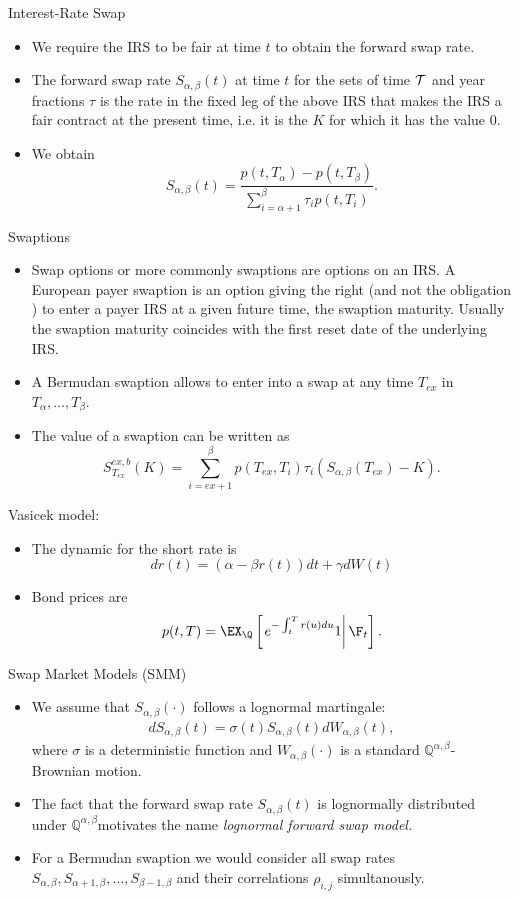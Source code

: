{Interest-Rate Swap}

\begin{itemize}
\item<1-> We require the IRS to be fair at time $t$ to obtain the
forward swap rate.
\item<2->
The forward swap rate $S_{\alpha,\beta}(t)$ at time $t$ for the
sets of time $\cal T$ and year fractions $\tau$ is the rate in the
fixed leg of the above IRS that makes the IRS a fair contract at
the present time, i.e. it is the $K$ for which
it has the value $0$.
\item<3->
 We obtain
\begin{equation}\label{FSR-1}
S_{\alpha,\beta}(t)=\frac{p(t,T_{\alpha})-p(t,T_{\beta})}{\sum_{i=\alpha+1}^{\beta}\tau_ip(t,T_i)}.
\end{equation}
\end{itemize}

{Swaptions}
\begin{itemize}
\item<1->Swap options or more commonly swaptions are options on an IRS. A
European payer swaption is an option giving the right (and not the
obligation ) to enter a payer IRS at a given future time, the
swaption maturity. Usually the swaption maturity coincides with
the first reset date of the underlying IRS.
\item<2->
A Bermudan swaption allows to enter into a swap at any time $T_{ex}$ in $T_\alpha, \ldots,
T_\beta$.
\item<3-> The value of  a swaption can be written as
$$
S_{T_{ex}}^{ex,b}(K)= \sum_{i=ex+1}^{\beta} p(T_{ex},T_i)\tau_i(S_{\alpha,\beta}(T_{ex})-K).
$$
\end{itemize}

{Vasicek model:}
\begin{itemize}
\item<1-> The dynamic for the short rate is
$$
dr(t) = (\alpha -\beta r(t))dt +\gamma dW(t)
$$
\item<2-> Bond prices are
$$
p(t,T) = \EX_{\Q} \left[\left. e^{- \int_t^T r(u) du} 1
\right| \F_t \right].
$$
\end{itemize}

{Swap Market Models (SMM)}
\begin{itemize}
\item<1->
We assume that $S_{\alpha,\beta}(\cdot)$ follows a
lognormal martingale:
\begin{eqnarray*}
dS_{\alpha,\beta}(t) = \sigma (t) S_{\alpha,\beta}(t)
dW_{\alpha,\beta}(t),
\end{eqnarray*}
where $\sigma$ is a deterministic function and
$W_{\alpha,\beta}(\cdot)$ is a standard $\mathbb
Q^{\alpha,\beta}$-Brownian motion.
\item<2-> The fact that the forward swap
rate $S_{\alpha,\beta}(t)$ is lognormally distributed under
$\mathbb Q^{\alpha,\beta}$motivates the name {\em lognormal
forward swap model.}
\item<3-> For a Bermudan swaption we would consider all swap rates
$S_{\alpha,\beta}, S_{\alpha+1,\beta}, \ldots, S_{\beta-1,\beta}$ and their correlations $\rho_{i,j}$ simultanously.
\end{itemize}

